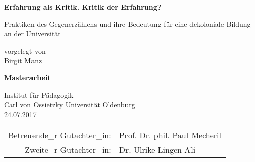 \documentclass[12pt]{article}
\begin{document}
\onehalfspacing
\setlength{\epigraphwidth}{0.7\textwidth}
\begin{titlepage}
    \begin{center}
        \vspace*{1cm}
        
        \huge
        \textbf{Erfahrung als Kritik. Kritik der Erfahrung?}
        
        \vspace{0.5cm}
        \LARGE
Praktiken des Gegenerzählens und ihre Bedeutung für eine dekoloniale Bildung an der Universität
        
        \vspace{1.5cm}
        
        vorgelegt von\\
        Birgit Manz
        
        \vspace{3cm}
       
        \textbf{Masterarbeit}
                
        \vspace{0.8cm}
     
        
        \Large
        Institut für Pädagogik\\
        Carl von Ossietzky Universität Oldenburg\\
        24.07.2017\\
        \vspace{4cm} 
        \begin{table}[htpb]
          \centering
          \Large
          \begin{tabular}{rl}
            Betreuende\_r Gutachter\_in:& Prof. Dr. phil. Paul Mecheril \\
            Zweite\_r Gutachter\_in: &Dr. Ulrike Lingen-Ali
          \end{tabular}
        \end{table}
          
      \end{center}

\end{titlepage}


\tableofcontents














\end{document}
